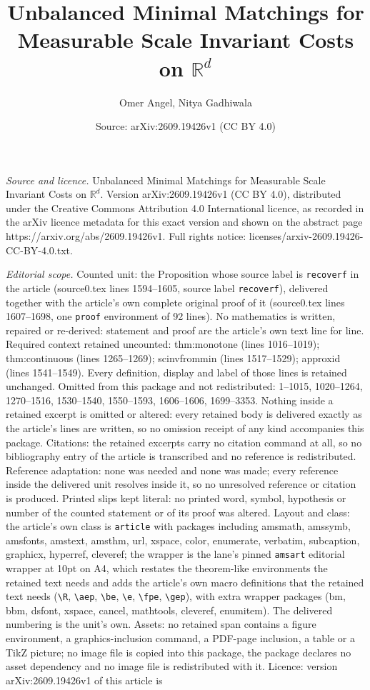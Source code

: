 \documentclass[10pt,a4paper]{amsart}
\title[Unbalanced Minimal Matchings for Measurable Scale Invariant ]{Unbalanced Minimal Matchings for Measurable Scale Invariant Costs on $\mathbb{R}^d$}
\author{Omer Angel, Nitya Gadhiwala}
\date{Source: arXiv:2609.19426v1 (CC BY 4.0)}
\begin{document}
\maketitle

\noindent\emph{Source and licence.} Unbalanced Minimal Matchings for Measurable Scale Invariant Costs on $\mathbb{R}^d$. Version arXiv:2609.19426v1 (CC BY 4.0), distributed under the Creative Commons Attribution 4.0 International licence, as recorded in the arXiv licence metadata for this exact version and shown on the abstract page https://arxiv.org/abs/2609.19426v1. Full rights notice: licenses/arxiv-2609.19426-CC-BY-4.0.txt.\par\smallskip

\noindent\textit{Editorial scope.} Counted unit: the Proposition whose source label is \texttt{recoverf} in the article (source0.tex lines 1594--1605, source label \texttt{recoverf}), delivered together with the article's own complete original proof of it (source0.tex lines 1607--1698, one \texttt{proof} environment of 92 lines). No mathematics is written, repaired or re-derived: statement and proof are the article's own text line for line. Required context retained uncounted: thm:monotone (lines 1016--1019); thm:continuous (lines 1265--1269); scinvfrommin (lines 1517--1529); approxid (lines 1541--1549). Every definition, display and label of those lines is retained unchanged. Omitted from this package and not redistributed: 1--1015, 1020--1264, 1270--1516, 1530--1540, 1550--1593, 1606--1606, 1699--3353. Nothing inside a retained excerpt is omitted or altered: every retained body is delivered exactly as the article's lines are written, so no omission receipt of any kind accompanies this package. Citations: the retained excerpts carry no citation command at all, so no bibliography entry of the article is transcribed and no reference is redistributed. Reference adaptation: none was needed and none was made; every reference inside the delivered unit resolves inside it, so no unresolved reference or citation is produced. Printed slips kept literal: no printed word, symbol, hypothesis or number of the counted statement or of its proof was altered. Layout and class: the article's own class is \texttt{article} with packages including amsmath, amssymb, amsfonts, amstext, amsthm, url, xspace, color, enumerate, verbatim, subcaption, graphicx, hyperref, cleveref; the wrapper is the lane's pinned \texttt{amsart} editorial wrapper at 10pt on A4, which restates the theorem-like environments the retained text needs and adds the article's own macro definitions that the retained text needs (\texttt{\textbackslash R}, \texttt{\textbackslash aep}, \texttt{\textbackslash be}, \texttt{\textbackslash e}, \texttt{\textbackslash fpe}, \texttt{\textbackslash gep}), with extra wrapper packages (bm, bbm, dsfont, xspace, cancel, mathtools, cleveref, enumitem). The delivered numbering is the unit's own. Assets: no retained span contains a figure environment, a graphics-inclusion command, a PDF-page inclusion, a table or a TikZ picture; no image file is copied into this package, the package declares no asset dependency and no image file is redistributed with it. Licence: version arXiv:2609.19426v1 of this article is 
\end{document}
